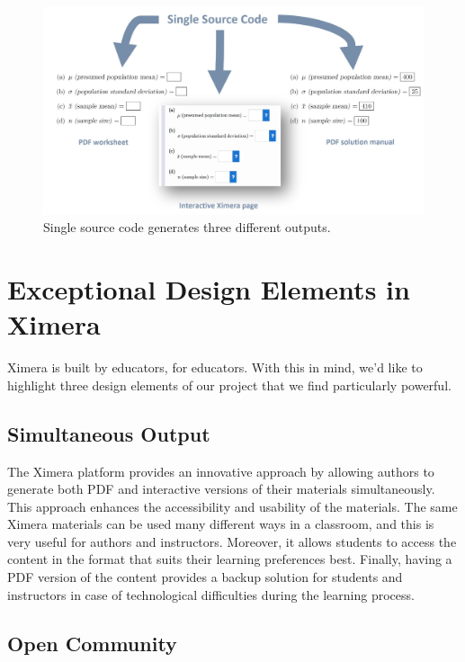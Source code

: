\documentclass{ximera}
\begin{document}
 \begin{figure}
  \centering
  \includegraphics[width=.8\textwidth]{SimultaneousOutput.jpg}
  \caption{Single source code generates three different outputs.}
  \label{F:sout}
\end{figure}





\section*{Exceptional Design Elements in Ximera}


Ximera is built by educators, for educators. With this in mind, we'd
like to highlight three design elements of our project that we find
particularly powerful.


 \subsection*{Simultaneous Output}

 The Ximera platform provides an innovative approach by allowing
 authors to generate both PDF and interactive versions of their
 materials simultaneously. This approach enhances the accessibility
 and usability of the materials. The same Ximera materials can be used
 many different ways in a classroom, and this is very useful for
 authors and instructors.  Moreover, it allows students to access the
 content in the format that suits their learning preferences best.
 Finally, having a PDF version of the content provides a backup
 solution for students and instructors in case of technological
 difficulties during the learning process.


 


\subsection*{Open Community}
\end{document}
